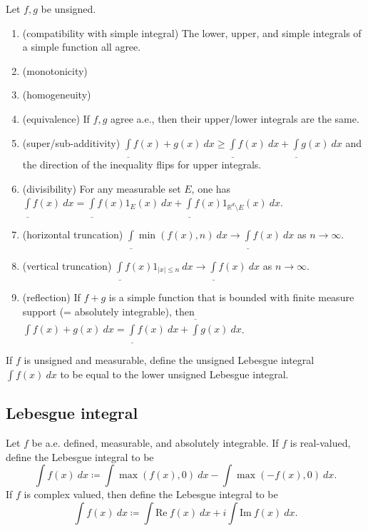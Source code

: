 \documentclass[12pt]{article}
\begin{document}
\begin{proposition}
	Let $f,g$ be unsigned. \hfill
	\begin{enumerate}
		\item (compatibility with simple integral) The lower, upper, and simple integrals of a simple function all agree.
		\item (monotonicity)
		\item (homogeneuity)
		\item (equivalence) If $f,g$ agree a.e., then their upper/lower integrals are the same.
		\item (super/sub-additivity) $\underline{\int}f(x)+g(x)\ dx\geq\underline{\int}f(x)\ dx+\underline{\int}g(x)\ dx$ and the direction of the inequality flips for upper integrals.
		\item (divisibility) For any measurable set $E$, one has $\underline{\int}f(x)\ dx=\underline{\int}f(x)1_{E}(x)\ dx+\underline{\int}f(x)1_{\mathbb{R}^d\setminus E}(x)\ dx$.
		\item (horizontal truncation) $\underline{\int}\min(f(x),n)\ dx\to\underline{\int}f(x)\ dx$ as $n\to\infty$.
		\item (vertical truncation) $\underline{\int}f(x)1_{|x|\leq n}\ dx\to\underline{\int}f(x)\ dx$ as $n\to\infty$.
		\item (reflection) If $f+g$ is a simple function that is bounded with finite measure support (= absolutely integrable), then $\int f(x)+g(x)\ dx=\underline{\int}f(x)\ dx + \overline{\int}g(x)\ dx$.
	\end{enumerate}
\end{proposition}

\begin{definition}
	If $f$ is unsigned and measurable, define the unsigned Lebesgue integral $\int f(x)\ dx$ to be equal to the lower unsigned Lebesgue integral.
\end{definition}


\subsection{Lebesgue integral} %

\begin{definition}
	Let $f$ be a.e. defined, measurable, and absolutely integrable. If $f$ is real-valued, define the Lebesgue integral to be 
	\begin{equation*}
		\int f(x)\ dx\coloneqq \int \max(f(x),0)\ dx - \int \max(-f(x),0)\ dx.
	\end{equation*}
	If $f$ is complex valued, then define the Lebesgue integral to be 
	\begin{equation*}
		\int f(x)\ dx\coloneqq \int\text{Re}\ f(x)\ dx+i\int\text{Im}\ f(x)\ dx.
	\end{equation*}
\end{definition}
\end{document}
